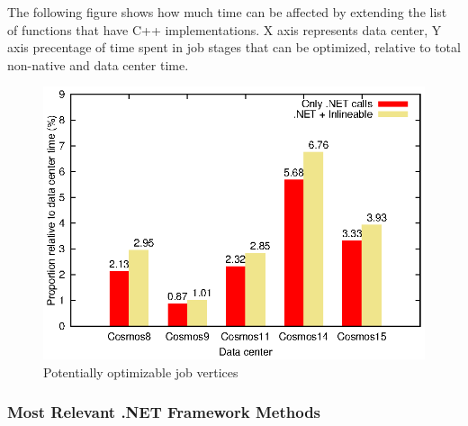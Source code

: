 The following figure shows how much time can be affected by extending the list of functions that have C++ implementations. X axis represents data center, Y axis precentage of time spent in job stages that can be optimized, relative to total non-native and data center time.

\begin{figure}[ht]
\includegraphics[scale=0.8]{graphs/potentiallyOptimizable}

\caption{Potentially optimizable job vertices}
\end{figure}

\subsubsection{Most Relevant .NET Framework Methods}

